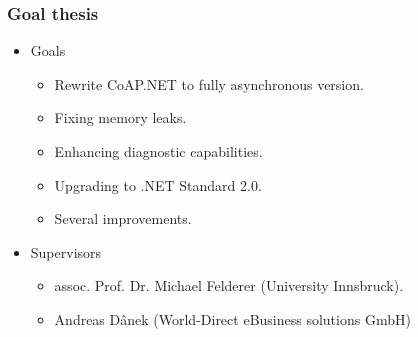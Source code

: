 \documentclass[11pt,t,usepdftitle=false,aspectratio=169,usenames,dvipsnames]{beamer}
\begin{document}
    \begin{frame}
        \frametitle{Goal thesis}

        \begin{itemize}
            \item Goals
            \begin{itemize}
                \item Rewrite CoAP.NET to fully asynchronous version.
                \item Fixing memory leaks.
                \item Enhancing diagnostic capabilities.
                \item Upgrading to .NET Standard 2.0.
                \item Several improvements.
            \end{itemize}
            \item Supervisors
            \begin{itemize}
                \item assoc. Prof. Dr. Michael Felderer (University Innsbruck).
                \item Andreas Dânek (World-Direct eBusiness solutions GmbH)
            \end{itemize}
        \end{itemize}
    \end{frame}
\end{document}
